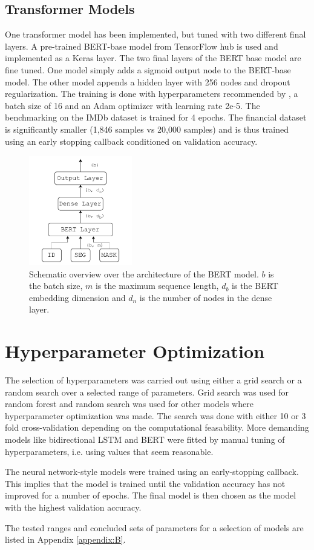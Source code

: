 \subsection{Transformer Models}

One transformer model has been implemented, but tuned with two different final layers. A pre-trained BERT-base model from TensorFlow hub is used and implemented as a Keras layer. The two final layers of the BERT base model are fine tuned. One model simply adds a sigmoid output node to the BERT-base model. The other model appends a hidden layer with 256 nodes and dropout regularization. 
The training is done with hyperparameters recommended by \citeauthor{devlin2018bert}, a batch size of 16 and an Adam optimizer with learning rate 2e-5. 
The benchmarking on the IMDb dataset is trained for 4 epochs. The financial dataset is significantly smaller (1,846 samples vs 20,000 samples) and is thus trained using an early stopping callback conditioned on validation accuracy.  

\begin{figure}[t]
    \centering
    \includegraphics[width=0.4\textwidth]{Figures/figs-bert-ff.pdf}
    \caption{Schematic overview over the architecture of the BERT model. $b$ is the batch size, $m$ is the maximum sequence length, $d_b$ is the BERT embedding dimension and $d_n$ is the number of nodes in the dense layer.}
\end{figure}


\section{Hyperparameter Optimization}

The selection of hyperparameters was carried out using either a grid search or a random search over a selected range of parameters. Grid search was used for random forest and random search was used for other models where hyperparameter optimization was made. The search was done with either 10 or 3 fold cross-validation depending on the computational feasability. More demanding models like bidirectional LSTM and BERT were fitted by manual tuning of hyperparameters, i.e. using values that seem reasonable. 

The neural network-style models were trained using an early-stopping callback. This implies that the model is trained until the validation accuracy has not improved for a number of epochs. The final model is then chosen as the model with the highest validation accuracy. 

The tested ranges and concluded sets of parameters for a selection of models are listed in Appendix \ref{appendix:B}.